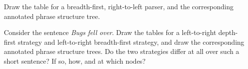\begin{center}

    \hspace{1em}
\end{center}
%
\begin{exercise}
    Draw the table for a breadth-first, right-to-left parser, and the corresponding annotated phrase structure tree.
\end{exercise}
%
\begin{exercise}
    Consider the sentence \emph{Bugs fell over}.
    Draw the tables for a left-to-right depth-first strategy and left-to-right breadth-first strategy, and draw the corresponding annotated phrase structure trees.
    Do the two strategies differ at all over such a short sentence?
    If so, how, and at which nodes?
\end{exercise}

